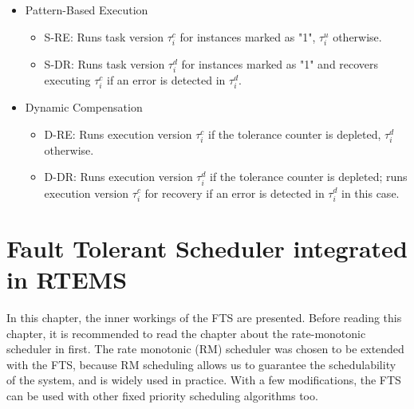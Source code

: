 \begin{itemize}
\item Pattern-Based Execution

\vspace{-0.3cm}
	\begin{itemize}	\item S-RE: Runs task version  $\tau_i^c$ for instances marked as "1", $\tau_i^u$ otherwise.
	\item S-DR: Runs task version  $\tau_i^d$ for instances marked as "1" and recovers executing $\tau_i^c$ if an error is detected in $\tau_i^d$.
	\end{itemize}

\vspace{-0.5cm}

\item Dynamic Compensation

\vspace{-0.3cm}

	\begin{itemize}
	\item D-RE: Runs execution version $\tau_i^c$ if the tolerance counter is depleted, $\tau_i^d$ otherwise.
	\item D-DR: Runs execution version $\tau_i^d$ if the tolerance counter is depleted; runs execution version $\tau_i^c$ for recovery if an error is detected in $\tau_i^d$ in this case.
	\end{itemize}
\end{itemize}


\chapter{Fault Tolerant Scheduler integrated in RTEMS}
In this chapter, the inner workings of the FTS are presented. Before reading this chapter, it is recommended to read the chapter about the rate-monotonic scheduler in \cite{rmtut} first. The rate monotonic (RM) scheduler was chosen to be extended with the FTS, because RM scheduling allows us to guarantee the schedulability of the system, and is widely used in practice. With a few modifications, the FTS can be used with other fixed priority scheduling algorithms too.

